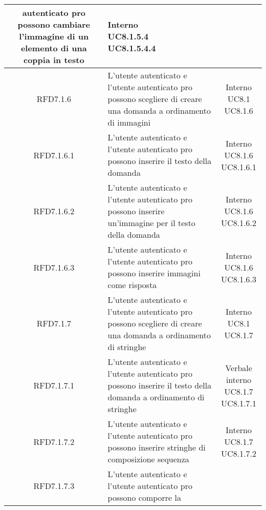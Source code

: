 \begin{longtable}{|c|>{\centering}m{7cm}|c|}
autenticato pro possono cambiare
l’immagine di un elemento di una coppia
in testo & \makecell{Interno\\ UC8.1.5.4 \\UC8.1.5.4.4 } \\ \hline
			 \hypertarget{{RFD7.1.6}}{{RFD7.1.6}} & L’utente autenticato e l’utente
autenticato pro possono scegliere di
creare una domanda a ordinamento di
immagini & \makecell{Interno\\ UC8.1 \\UC8.1.6 } \\ \hline
			 \hypertarget{{RFD7.1.6.1}}{{RFD7.1.6.1}} & L’utente autenticato e l’utente
autenticato pro possono inserire il testo
della domanda & \makecell{Interno\\ UC8.1.6 \\UC8.1.6.1 } \\ \hline
			 \hypertarget{{RFD7.1.6.2}}{{RFD7.1.6.2}} & L’utente autenticato e l’utente
autenticato pro possono inserire
un’immagine per il testo della domanda & \makecell{Interno\\ UC8.1.6 \\UC8.1.6.2 } \\ \hline
			 \hypertarget{{RFD7.1.6.3}}{{RFD7.1.6.3}} & L’utente autenticato e l’utente
autenticato pro possono inserire immagini
come risposta & \makecell{Interno\\ UC8.1.6 \\UC8.1.6.3 } \\ \hline
			 \hypertarget{{RFD7.1.7}}{{RFD7.1.7}} & L’utente autenticato e l’utente
autenticato pro possono scegliere di
creare una domanda a ordinamento di
stringhe & \makecell{Interno\\ UC8.1 \\UC8.1.7 } \\ \hline
			 \hypertarget{{RFD7.1.7.1}}{{RFD7.1.7.1}} & L’utente autenticato e l’utente
autenticato pro possono inserire il testo
della domanda a ordinamento di stringhe & \makecell{Verbale interno\\ UC8.1.7 \\UC8.1.7.1 } \\ \hline
			 \hypertarget{{RFD7.1.7.2}}{{RFD7.1.7.2}} & L’utente autenticato e l’utente
autenticato pro possono inserire stringhe
di composizione sequenza & \makecell{Interno\\ UC8.1.7 \\UC8.1.7.2 } \\ \hline
			 \hypertarget{{RFD7.1.7.3}}{{RFD7.1.7.3}} & L’utente autenticato e l’utente
autenticato pro possono comporre la

\end{longtable}
